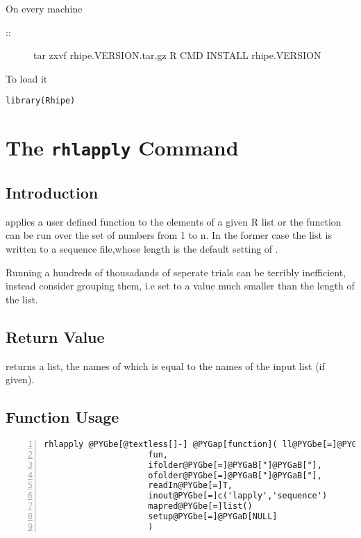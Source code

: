 \documentclass[letterpaper,10pt,english]{manual}
\begin{document}
On every machine
\begin{description}
\item[::]
tar zxvf rhipe.VERSION.tar.gz
R CMD INSTALL rhipe.VERSION

\end{description}

To load it

\begin{Verbatim}[commandchars=@\[\]]
library(Rhipe)
\end{Verbatim}

\resetcurrentobjects
\hypertarget{--doc-rhlapply}{}

\chapter{The \texttt{rhlapply} Command}


\section{Introduction}

 applies a user defined function to the elements of a given
R list or the function can be run over the set of numbers from 1 to
n. In the former case the list is written to a sequence file,whose length is the
default setting of .

Running a hundreds of thousadands of seperate trials
can be terribly inefficient, instead consider grouping them, i.e set
 to a value much smaller than the length of the
list.


\section{Return Value}

 returns a list, the names of which is equal to the names
of the input list (if given).


\section{Function Usage}

\begin{Verbatim}[commandchars=@\[\],numbers=left,firstnumber=1,stepnumber=1]
rhlapply @PYGbe[@textless[]-] @PYGap[function]( ll@PYGbe[=]@PYGaD[NULL],
                     fun,
                     ifolder@PYGbe[=]@PYGaB["]@PYGaB["],
                     ofolder@PYGbe[=]@PYGaB["]@PYGaB["],
                     readIn@PYGbe[=]T,
                     inout@PYGbe[=]c('lapply','sequence')
                     mapred@PYGbe[=]list()
                     setup@PYGbe[=]@PYGaD[NULL]
                     )
\end{Verbatim}
\end{document}
